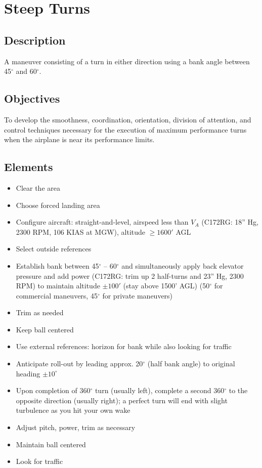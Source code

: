 \section{Steep Turns}

\subsection{Description}

A maneuver consisting of a turn in either direction using a bank angle between
45$^\circ$ and 60$^\circ$.

\subsection{Objectives}

To develop the smoothness, coordination, orientation, division of attention,
and control techniques necessary for the execution of maximum performance turns
when the airplane is near its performance limits.

\subsection{Elements}

\begin{itemize}
  \item Clear the area
  \item Choose forced landing area
  \item Configure aircraft: straight-and-level, airspeed less than $V_A$
    (C172RG: 18'' Hg, 2300 RPM, 106 KIAS at MGW), altitude $\geq 1600'$ AGL 
  \item Select outside references
  \item Establish bank between 45$^\circ$ – 60$^\circ$ and simultaneously apply
    back elevator pressure and add power (C172RG: trim up 2 half-turns and 23”
    Hg, 2300 RPM) to maintain altitude $\pm 100'$ (stay above 1500' AGL)
    (50$^\circ$ for commercial maneuvers, 45$^\circ$ for private maneuvers)
  \item Trim as needed
  \item Keep ball centered
  \item Use external references: horizon for bank while also looking for
    traffic
  \item Anticipate roll-out by leading approx. 20$^\circ$ (half bank angle) to
    original heading $\pm 10^\circ$
  \item Upon completion of 360$^\circ$ turn (usually left), complete a second
    360$^\circ$ to the opposite direction (usually right); a perfect turn will
    end with slight turbulence as you hit your own wake
  \item Adjust pitch, power, trim as necessary
  \item Maintain ball centered 
  \item Look for traffic
\end{itemize}

